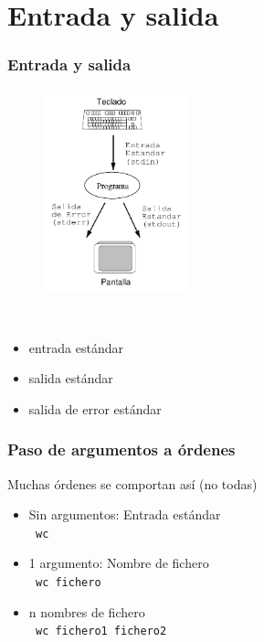 \documentclass[ucs]{beamer}
\begin{document}
\section{Entrada y salida}
\begin{frame}[fragile]
\frametitle{Entrada y salida}
\begin{minipage}{5cm}
\begin{figure}
\centerline{\includegraphics[width=4.2cm]{figs/stdinout}}
\end{figure}
\end{minipage} \hfill
\
\begin{minipage}{4cm}
\begin{itemize} 
\item entrada estándar
\item salida estándar
\item salida de error estándar
\end{itemize}
\end{minipage}\hfill
\end{frame}
\begin{frame}[fragile]
\frametitle{Paso de argumentos a órdenes}
Muchas órdenes se comportan así (no todas)
\begin{itemize} 
\item Sin argumentos: Entrada estándar\\ \texttt{ wc } 
\item 1 argumento: Nombre de fichero \\ \texttt{ wc fichero}
\item n nombres de fichero\\  \texttt{ wc fichero1 fichero2}
\end{itemize}
\end{frame}
\end{document}
